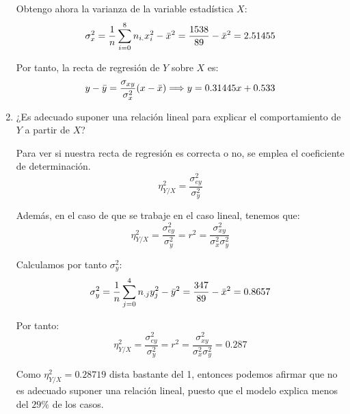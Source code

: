 \begin{ejercicio}
\begin{enumerate}
        Obtengo ahora la varianza de la variable estadística $X$:
        \begin{equation*}
            \sigma_x^2 = \frac{1}{n}\sum_{i=0}^8 n_{i.}x_i^2 - \bar{x}^2 = \frac{1538}{89} - \Bar{x}^2 = 2.51455
        \end{equation*}

        Por tanto, la recta de regresión de $Y$ sobre $X$ es:
        \begin{equation*}
            y-\Bar{y} = \frac{\sigma_{xy}}{\sigma_x^2}(x-\Bar{x}) \Longrightarrow y = 0.31445x +0.533
        \end{equation*}

        \item ¿Es adecuado suponer una relación lineal para explicar el comportamiento de $Y$ a partir de $X$?

        Para ver si nuestra recta de regresión es correcta o no, se emplea el coeficiente de determinación.
        \begin{equation*}
            \eta^2_{Y/X} = \frac{\sigma^2_{ey}}{\sigma^2_y}
        \end{equation*}

        Además, en el caso de que se trabaje en el caso lineal, tenemos que:
        \begin{equation*}
            \eta^2_{Y/X} = \frac{\sigma^2_{ey}}{\sigma^2_y} = r^2 = \frac{\sigma_{xy}^2}{\sigma_x^2 \sigma_y^2} 
        \end{equation*}

        Calculamos por tanto $\sigma^2_y$:
        \begin{equation*}
            \sigma_y^2 = \frac{1}{n}\sum_{j=0}^4 n_{.j}y_j^2 - \bar{y}^2 = \frac{347}{89} - \Bar{x}^2 = 0.8657
        \end{equation*}

        Por tanto:
        \begin{equation*}
            \eta^2_{Y/X} = \frac{\sigma^2_{ey}}{\sigma^2_y} = r^2 = \frac{\sigma_{xy}^2}{\sigma_x^2 \sigma_y^2} = 0.287
        \end{equation*}

        Como $\eta^2_{Y/X}=0.28719$ dista bastante del 1, entonces podemos afirmar que no es adecuado suponer una relación lineal, puesto que el modelo explica menos del $29\%$ de los casos.


\end{enumerate}
\end{ejercicio}
